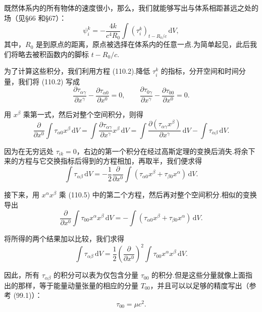 既然体系内的所有物体的速度很小，那么，我们就能够写出与体系相距甚远之处的场（见§66 和§67）：
\begin{equation}
  \psi_i^k=-\frac{4k}{c^{4}R_0}\int(\tau_i^k)_{t-R_0/c}\,\mathrm{d}V,
\end{equation}
其中，$R_0$ 是到原点的距离，原点被选择在体系内的任意一点.为简单起见，此后我们将略去被积函数内的脚标 $t-R_0/c$.

为了计算这些积分，我们利用方程 (110.2).降低 $\tau_i^k$ 的指标，分开空间和时间分量，我们将 (110.2) 写成
\begin{equation}
  \frac{\partial\tau_{\alpha\gamma}}{\partial x^{\gamma}}
  -\frac{\partial\tau_{\alpha0}}{\partial x^{0}}=0,
  \qquad
  \frac{\partial\tau_{0\gamma}}{\partial x^{\gamma}}
  -\frac{\partial\tau_{00}}{\partial x^{0}}=0.
\end{equation}

用 $x^{\beta}$ 乘第一式，然后对整个空间积分，则得
\begin{equation*}
  \frac{\partial}{\partial x^{0}}\int\tau_{\alpha0}x^{\beta}\,\mathrm{d}V
  =\int\frac{\partial\tau_{\alpha\gamma}}{\partial x^{\gamma}}
  x^{\beta}\,\mathrm{d}V
  =\int\frac{\partial(\tau_{\alpha\gamma}x^{\beta})}{\partial x^{\gamma}}
  \,\mathrm{d}V-\int\tau_{\alpha\beta}\,\mathrm{d}V.
\end{equation*}

因为在无穷远处 $\tau_{ik}=0$，右边的第一个积分在经过高斯定理的变换后消失.将余下来的方程与它交换指标后得到的方程相加，再取半，我们便求得
\begin{equation*}
  \int\tau_{\alpha\beta}\,\mathrm{d}V
  =-\frac{1}{2}\frac{\partial}{\partial x^{0}}
  \int(\tau_{\alpha0}x^{\beta}+\tau_{\beta0}x^{\alpha})\,\mathrm{d}V.
\end{equation*}

接下来，用 $x^{\alpha}x^{\beta}$ 乘 (110.5) 中的第二个方程，然后再对整个空间积分.相似的变换导出
\begin{equation*}
  \frac{\partial}{\partial x^{0}}\int\tau_{00}x^{\alpha}x^{\beta}\,\mathrm{d}V
  =-\int(\tau_{\alpha0}x^{\beta}+\tau_{\beta0}x^{\alpha})\,\mathrm{d}V.
\end{equation*}

将所得的两个结果加以比较，我们求得
\begin{equation}
  \int\tau_{\alpha\beta}\,\mathrm{d}V
  =\frac{1}{2}\left(\frac{\partial}{\partial x^{0}}\right)^{2}
  \int\tau_{00}x^{\alpha}x^{\beta}\,\mathrm{d}V.
\end{equation}

因此，所有 $\tau_{\alpha\beta}$ 的积分可以表为仅包含分量 $\tau_{00}$ 的积分.但是这些分量就像上面指出的那样，等于能量动量张量的相应的分量 $T_{00}$，并且可以以足够的精度写出（参考 (99.1)）：
\begin{equation}
  \tau_{00}=\mu c^{2}.
\end{equation}


